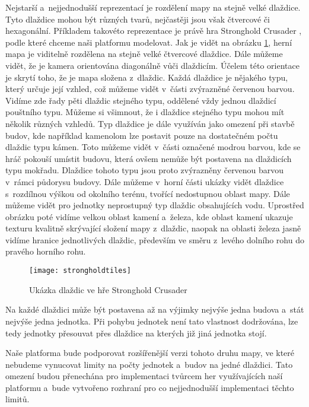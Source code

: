 Nejstarší a~nejjednodušší reprezentací je rozdělení mapy na stejně velké dlaždice. Tyto dlaždice mohou být různých tvarů, nejčastěji jsou však čtvercové či hexagonální. Příkladem takovéto reprezentace je právě hra Stronghold Crusader \citep{site:strongholdcrus}, podle které chceme naši platformu modelovat. Jak je vidět na obrázku  \ref{fig:tiletype}, herní mapa je viditelně rozdělena na stejně velké čtvercové dlaždice. Dále můžeme vidět, že je kamera orientována diagonálně vůči dlaždicím. Účelem této orientace je skrytí toho, že je mapa složena z~dlaždic. Každá dlaždice je nějakého typu, který určuje její vzhled, což můžeme vidět v~části zvýrazněné červenou barvou. Vidíme zde řady pěti dlaždic stejného typu, oddělené vždy jednou dlaždicí pouštního typu. Můžeme si všimnout, že i dlaždice stejného typu mohou mít několik různých vzhledů. Typ dlaždice je dále využíván jako omezení při stavbě budov, kde například kamenolom lze postavit pouze na dostatečném počtu dlaždic typu kámen. Toto můžeme vidět v~části označené modrou barvou, kde se hráč pokouší umístit budovu, která ovšem nemůže být postavena na dlaždicích typu mokřadu. Dlaždice tohoto typu jsou proto zvýrazněny červenou barvou v~rámci půdorysu budovy. Dále můžeme v~horní části ukázky vidět dlaždice s~rozdílnou výškou od okolního terénu, tvořící nedostupnou oblast mapy. Dále můžeme vidět pro jednotky neprostupný typ dlaždic obsahujících vodu. Uprostřed obrázku poté vidíme velkou oblast kamení a~železa, kde oblast kamení ukazuje texturu kvalitně skrývající složení mapy z~dlaždic, naopak na oblasti železa jasně vidíme hranice jednotlivých dlaždic, především ve směru z~levého dolního rohu do pravého horního rohu.

\begin{figure}[h]
	\centering
	\texttt{[image: strongholdtiles]}
	\caption{Ukázka dlaždic ve hře Stronghold Crusader}
	\label{fig:tiletype}
\end{figure}

Na každé dlaždici může být postavena až na výjimky nejvýše jedna budova a~stát nejvýše jedna jednotka. Při pohybu jednotek není tato vlastnost dodržována, lze tedy jednotky přesouvat přes dlaždice na kterých již jiná jednotka stojí. 

Naše platforma bude podporovat rozšířenější verzi tohoto druhu mapy, ve které nebudeme vynucovat limity na počty jednotek a~budov na jedné dlaždici. Tato omezení budou přenechána pro implementaci tvůrcem her využívajících naší platformu a~bude vytvořeno rozhraní pro co nejjednodušší implementaci těchto limitů. 

